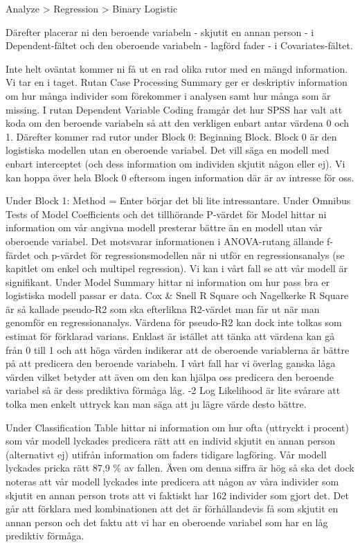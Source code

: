 \documentclass[
]{book}
\begin{document}
Analyze \textgreater{} Regression \textgreater{} Binary Logistic

Därefter placerar ni den beroende variabeln - skjutit en annan person - i Dependent-fältet och den oberoende variabeln - lagförd fader - i Covariates-fältet.

Inte helt oväntat kommer ni få ut en rad olika rutor med en mängd information. Vi tar en i taget. Rutan Case Processing Summary ger er deskriptiv information om hur många individer som förekommer i analysen samt hur många som är missing. I rutan Dependent Variable Coding framgår det hur SPSS har valt att koda om den beroende variabeln så att den verkligen enbart antar värdena 0 och 1. Därefter kommer rad rutor under Block 0: Beginning Block. Block 0 är den logistiska modellen utan en oberoende variabel. Det vill säga en modell med enbart interceptet (och dess information om individen skjutit någon eller ej). Vi kan hoppa över hela Block 0 eftersom ingen information där är av intresse för oss.

Under Block 1: Method = Enter börjar det bli lite intressantare. Under Omnibus Tests of Model Coefficients och det tillhörande P-värdet för Model hittar ni information om vår angivna modell presterar bättre än en modell utan vår oberoende variabel. Det motsvarar informationen i ANOVA-rutang ällande f-färdet och p-värdet för regressionsmodellen när ni utför en regressionsanalys (se kapitlet om enkel och multipel regression). Vi kan i vårt fall se att vår modell är signifikant. Under Model Summary hittar ni information om hur pass bra er logistiska modell passar er data. Cox \& Snell R Square och Nagelkerke R Square är så kallade pseudo-R2 som ska efterlikna R2-värdet man får ut när man genomför en regressionanalys. Värdena för pseudo-R2 kan dock inte tolkas som estimat för förklarad varians. Enklast är istället att tänka att värdena kan gå från 0 till 1 och att höga värden indikerar att de oberoende variablerna är bättre på att predicera den beroende variabeln. I vårt fall har vi överlag ganska låga värden vilket betyder att även om den kan hjälpa oss predicera den beroende variabel så är dess prediktiva förmåga låg. -2 Log Likelihood är lite svårare att tolka men enkelt uttryck kan man säga att ju lägre värde desto bättre.

Under Classification Table hittar ni information om hur ofta (uttryckt i procent) som vår modell lyckades predicera rätt att en individ skjutit en annan person (alternativt ej) utifrån information om faders tidigare lagföring. Vår modell lyckades pricka rätt 87,9 \% av fallen. Även om denna siffra är hög så ska det dock noteras att vår modell lyckades inte predicera att någon av våra individer som skjutit en annan person trots att vi faktiskt har 162 individer som gjort det. Det går att förklara med kombinationen att det är förhållandevis få som skjutit en annan person och det faktu att vi har en oberoende variabel som har en låg prediktiv förmåga.
\end{document}
